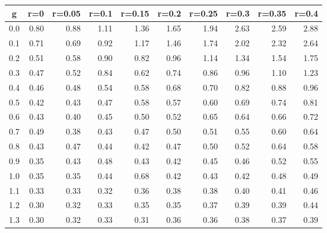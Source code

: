 %
\begin{table}[!tbp]
 \begin{center}
 \begin{tabular}{rrrrrrrrrr}\hline\hline
\multicolumn{1}{c}{g}&\multicolumn{1}{c}{r=0}&\multicolumn{1}{c}{r=0.05}&\multicolumn{1}{c}{r=0.1}&\multicolumn{1}{c}{r=0.15}&\multicolumn{1}{c}{r=0.2}&\multicolumn{1}{c}{r=0.25}&\multicolumn{1}{c}{r=0.3}&\multicolumn{1}{c}{r=0.35}&\multicolumn{1}{c}{r=0.4}\tabularnewline
\hline
0.0&0.80&0.88&1.11&1.36&1.65&1.94&2.63&2.59&2.88\tabularnewline
0.1&0.71&0.69&0.92&1.17&1.46&1.74&2.02&2.32&2.64\tabularnewline
0.2&0.51&0.58&0.90&0.82&0.96&1.14&1.34&1.54&1.75\tabularnewline
0.3&0.47&0.52&0.84&0.62&0.74&0.86&0.96&1.10&1.23\tabularnewline
0.4&0.46&0.48&0.54&0.58&0.68&0.70&0.82&0.88&0.96\tabularnewline
0.5&0.42&0.43&0.47&0.58&0.57&0.60&0.69&0.74&0.81\tabularnewline
0.6&0.43&0.40&0.45&0.50&0.52&0.65&0.64&0.66&0.72\tabularnewline
0.7&0.49&0.38&0.43&0.47&0.50&0.51&0.55&0.60&0.64\tabularnewline
0.8&0.43&0.47&0.44&0.42&0.47&0.50&0.52&0.64&0.58\tabularnewline
0.9&0.35&0.43&0.48&0.43&0.42&0.45&0.46&0.52&0.55\tabularnewline
1.0&0.35&0.35&0.44&0.68&0.42&0.43&0.42&0.48&0.49\tabularnewline
1.1&0.33&0.33&0.32&0.36&0.38&0.38&0.40&0.41&0.46\tabularnewline
1.2&0.30&0.32&0.33&0.35&0.35&0.37&0.39&0.39&0.44\tabularnewline
1.3&0.30&0.32&0.33&0.31&0.36&0.36&0.38&0.37&0.39\tabularnewline
\hline
\end{tabular}

\end{center}

\end{table}

